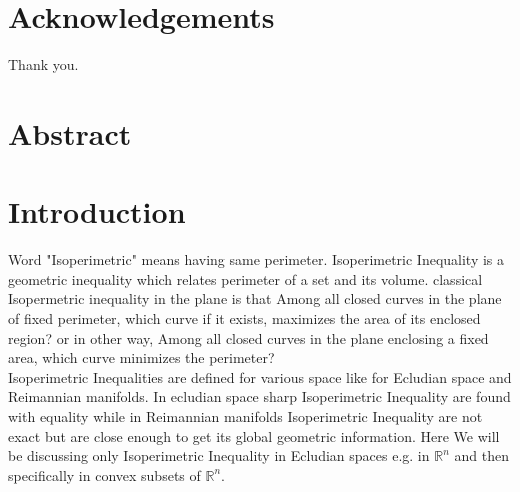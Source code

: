 \documentclass[oneside]{book}
\theoremstyle{definition}
\begin{document}
\chapter*{Acknowledgements}
Thank you.
\thispagestyle{empty}

\chapter*{Abstract}









































\chapter{Introduction}
\label{chap:c1}
 Word "Isoperimetric" means having same perimeter. Isoperimetric Inequality  is a geometric inequality which relates perimeter of a set and its volume. classical Isopermetric inequality in the plane is that Among all closed curves in the plane of fixed perimeter, which curve if it exists, maximizes the area of its enclosed region? or in other way, Among all closed curves in the plane enclosing a fixed area, which curve minimizes the perimeter?\\
Isoperimetric Inequalities are defined for various space like for Ecludian space and Reimannian manifolds. In ecludian space sharp Isoperimetric Inequality are found with equality while in Reimannian manifolds Isoperimetric Inequality are not exact but are close enough to get its global geometric information. Here We will be discussing only  Isoperimetric Inequality in Ecludian spaces e.g. in  $\mathbb{R}^{n}$ and then specifically in convex subsets of $\mathbb{R}^{n}$.
\\
\end{document}
